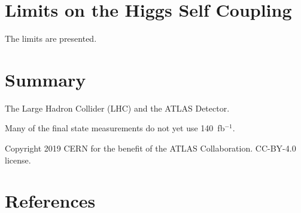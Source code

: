 \documentclass{moriond}
\begin{document}
\section{Limits on the Higgs Self Coupling} \label{sec:hh}

The limits are presented.

\section{Summary}

The Large Hadron Collider (LHC) \cite{Evans:2008zzb} and the ATLAS Detector.

Many of the final state measurements do not yet use 140~fb$^{-1}$.

Copyright 2019 CERN for the benefit of the ATLAS Collaboration. CC-BY-4.0 license.

\section*{References}


\end{document}
